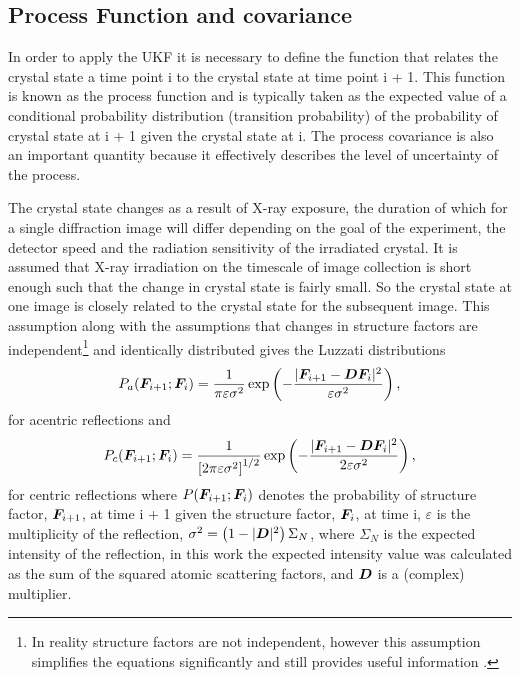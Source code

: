 \subsection{Process Function and covariance}
\label{sub:Process Function and covariance}
In order to apply the UKF it is necessary to define the function that relates the crystal state a time point i to the crystal state at time point i + 1.
This function is known as the process function and is typically taken as the expected value of a conditional probability distribution (transition probability) of the probability of crystal state at i + 1 given the crystal state at i.
The process covariance is also an important quantity because it effectively describes the level of uncertainty of the process.

The crystal state changes as a result of X-ray exposure, the duration of which for a single diffraction image will differ depending on the goal of the experiment, the detector speed and the radiation sensitivity of the irradiated crystal.
It is assumed that X-ray irradiation on the timescale of image collection is short enough such that the change in crystal state is fairly small.
So the crystal state at one image is closely related to the crystal state for the subsequent image.
This assumption along with the assumptions that changes in structure factors are independent\footnote{In reality structure factors are not independent, however this assumption simplifies the equations significantly and still provides useful information \cite{pannu1996improved}.} and identically distributed gives the Luzzati distributions \cite{luzzati1952traitement,read1990structure,pannu1996improved}
\begin{equation}
    P_a(\boldsymbol{F}_{i+1} ; \boldsymbol{F}_i) = \frac{1}{\pi \varepsilon \sigma^2} \exp \left(-\frac{|\boldsymbol{F}_{i+1} - \boldsymbol{D}\boldsymbol{F}_i|^2}{\varepsilon \sigma^2}\right),
    \label{eq:Luzzati distribution for acentric reflections}
\end{equation}
for acentric reflections and
\begin{equation}
    P_c(\boldsymbol{F}_{i+1} ; \boldsymbol{F}_i) = \frac{1}{\left[ 2 \pi \varepsilon \sigma^2 \right]^{1/2}} \exp \left(-\frac{|\boldsymbol{F}_{i+1} - \boldsymbol{D}\boldsymbol{F}_i|^2}{2 \varepsilon \sigma^2}\right),
    \label{eq:Luzzati distribution for centric reflections}
\end{equation}
for centric reflections where $P(\boldsymbol{F}_{i+1} ; \boldsymbol{F}_i)$ denotes the probability of structure factor, $\boldsymbol{F}_{i+1}$, at time i + 1 given the structure factor, $\boldsymbol{F}_{i}$, at time i, $\varepsilon$ is the multiplicity of the reflection, $\sigma^2 = \left(1 - |\boldsymbol{D}|^2 \right)\Sigma_N$, where $\Sigma_N$ is the expected intensity of the reflection, in this work the expected intensity value was calculated as the sum of the squared atomic scattering factors, and $\boldsymbol{D}$ is a (complex) multiplier.


